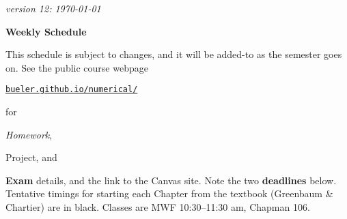 \documentclass[12pt]{article}
\newcommand{\due}[1]{\strut {\color{BrickRed} \textsl{#1}}}
\newcommand{\proj}[1]{\strut {\color{RedOrange} #1}}
\newcommand{\ee}[1]{\strut {\color{Blue} \textbf{#1}}}
\newcommand{\dlinline}[1]{{\color{Purple} \textbf{#1}}}
\newcommand{\dl}[1]{{\small \dlinline{#1}}}
\begin{document}
\hfill \small \emph{version 12: \today} \normalsize

\bigskip\bigskip
\centerline{\Large \textbf{Weekly Schedule}}

\bigskip
This schedule is subject to changes, and it will be added-to as the semester goes on.  See the public course webpage

\medskip

\centerline{\href{https://bueler.github.io/numerical/index.html}{\texttt{bueler.github.io/numerical/}}}

\noindent for \due{Homework}, \proj{Project}, and \ee{Exam} details, and the link to the Canvas site.  Note the two \dl{deadlines} below.  Tentative timings for starting each Chapter from the textbook (Greenbaum \& Chartier) are in black.  Classes are MWF 10:30--11:30 am, Chapman 106.

\bigskip
\end{document}
